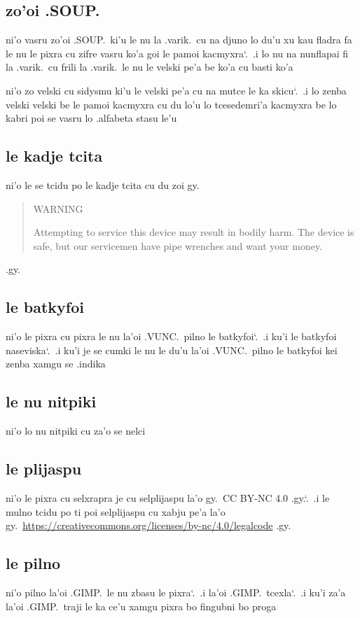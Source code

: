 \documentclass{report}
\newcommand\sds{\spacefactor\sfcode`.\ \space}
\begin{document}
\subsection{zo'oi .SOUP.}
ni'o vasru zo'oi .SOUP.\ ki'u le nu la .varik.\ cu na djuno lo du'u xu kau fladra fa le nu le pixra cu zifre vasru ko'a goi le pamoi kacmyxra\sds  .i lo nu na nunflapai fi la .varik.\ cu frili la .varik.\ le nu le velski pe'a be ko'a cu basti ko'a

ni'o zo velski cu sidysmu ki'u le velski pe'a cu na mutce le ka skicu\sds  .i lo zenba velski velski be le pamoi kacmyxra cu du lo'u lo tcesedemri'a kacmyxra be lo kabri poi se vasru lo .alfabeta stasu le'u

\subsection{le kadje tcita}
ni'o le se tcidu po le kadje tcita cu du zoi gy.
\begin{quote}
	WARNING

	Attempting to service this device may result in bodily harm.  The device is safe, but our servicemen have pipe wrenches and want your money.
\end{quote}
.gy.

\subsection{le batkyfoi}
ni'o le pixra cu pixra le nu la'oi .VUNC.\ pilno le batkyfoi\sds  .i ku'i le batkyfoi naseviska\sds  .i ku'i je se cumki le nu le du'u la'oi .VUNC.\ pilno le batkyfoi kei zenba xamgu se .indika

\subsection{le nu nitpiki}
ni'o lo nu nitpiki cu za'o se nelci

\subsection{le plijaspu}
ni'o le pixra cu selxrapra je cu selplijaspu la'o gy.\ CC BY-NC 4.0 .gy.\sds  .i le mulno tcidu po ti poi selplijaspu cu xabju pe'a la'o gy.\ \url{https://creativecommons.org/licenses/by-nc/4.0/legalcode} .gy.

\subsection{le pilno}
ni'o pilno la'oi .GIMP.\ le nu zbasu le pixra\sds  .i la'oi .GIMP.\ tcexla\sds  .i ku'i za'a la'oi .GIMP.\ traji le ka ce'u xamgu pixra bo fingubni bo proga
\end{document}
